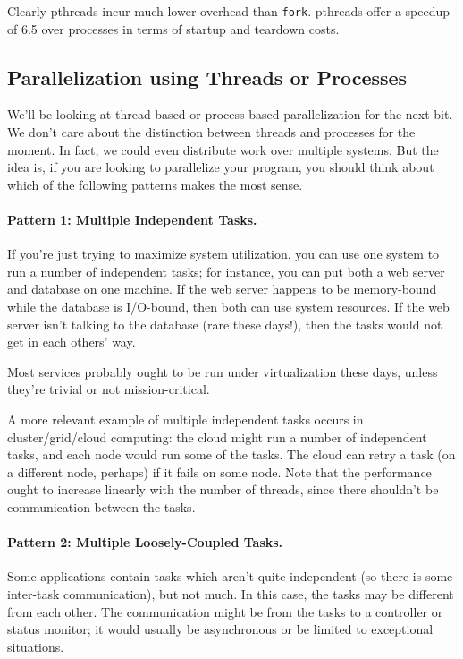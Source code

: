 \documentclass[a4paper]{report}
\begin{document}
Clearly pthreads incur much lower overhead than {\tt fork}. pthreads
offer a speedup of 6.5 over processes in terms of startup and teardown costs.

\subsection*{Parallelization using Threads or Processes}
We'll be looking at thread-based or process-based parallelization for the
next bit. We don't care about the distinction between threads and processes
for the moment. In fact, we could even distribute work over multiple systems. But the idea is, if you are looking to parallelize your program, you should think about which of the following patterns makes the most sense.

\paragraph{Pattern 1: Multiple Independent Tasks.} If you're just trying to maximize
system utilization, you can use one system to run a number of independent
tasks; for instance, you can put both a web server and database on
one machine. If the web server happens to be memory-bound while the
database is I/O-bound, then both can use system resources. If the web
server isn't talking to the database (rare these days!), then the tasks
would not get in each others' way.

Most services probably ought to be run under virtualization these
days, unless they're trivial or not mission-critical.

A more relevant example of multiple independent tasks occurs in
cluster/grid/cloud computing: the cloud might run a number of
independent tasks, and each node would run some of the tasks. The
cloud can retry a task (on a different node, perhaps) if it fails on
some node. Note that the performance ought to increase linearly with
the number of threads, since there shouldn't be communication between
the tasks.

\paragraph{Pattern 2: Multiple Loosely-Coupled Tasks.} Some applications contain
tasks which aren't quite independent (so there is some inter-task
communication), but not much.  In this case, the tasks may be
different from each other. The communication might be from the tasks
to a controller or status monitor; it would usually be asynchronous or
be limited to exceptional situations.
\end{document}
